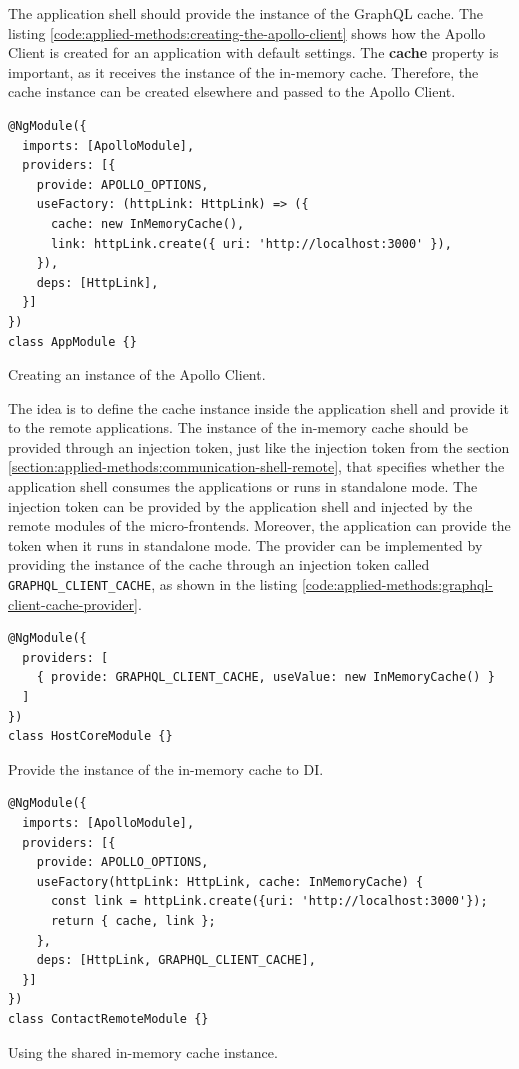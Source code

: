 \noindent The application shell should provide the instance of the GraphQL cache. The listing \ref{code:applied-methods:creating-the-apollo-client} shows how the Apollo Client is created for an application with default settings. The \textbf{cache} property is important, as it receives the instance of the in-memory cache. Therefore, the cache instance can be created elsewhere and passed to the Apollo Client. 
\ifshowListings
\begin{listing}[H]
\begin{verbatim}
@NgModule({
  imports: [ApolloModule],
  providers: [{
    provide: APOLLO_OPTIONS,
    useFactory: (httpLink: HttpLink) => ({
      cache: new InMemoryCache(),
      link: httpLink.create({ uri: 'http://localhost:3000' }),
    }),
    deps: [HttpLink],
  }]
})
class AppModule {}
\end{verbatim}
\caption{Creating an instance of the Apollo Client.}\label{code:applied-methods:creating-the-apollo-client}
\end{listing}
\fi

\noindent The idea is to define the cache instance inside the application shell and provide it to the remote applications. The instance of the in-memory cache should be provided through an injection token, just like the injection token from the section \ref{section:applied-methods:communication-shell-remote}, that specifies whether the application shell consumes the applications or runs in standalone mode. The injection token can be provided by the application shell and injected by the remote modules of the micro-frontends. Moreover, the application can provide the token when it runs in standalone mode. The provider can be implemented by providing the instance of the cache through an injection token called \texttt{GRAPHQL\_CLIENT\_CACHE}, as shown in the listing \ref{code:applied-methods:graphql-client-cache-provider}.

\ifshowListings
\begin{listing}[H]
\begin{verbatim}
@NgModule({
  providers: [
    { provide: GRAPHQL_CLIENT_CACHE, useValue: new InMemoryCache() }
  ]
})
class HostCoreModule {}
\end{verbatim}
\caption{Provide the instance of the in-memory cache to \ac{DI}.}\label{code:applied-methods:graphql-client-cache-provider}
\end{listing}
\fi


\ifshowListings
\begin{listing}[H]
\begin{verbatim}
@NgModule({
  imports: [ApolloModule],
  providers: [{
    provide: APOLLO_OPTIONS,
    useFactory(httpLink: HttpLink, cache: InMemoryCache) {
      const link = httpLink.create({uri: 'http://localhost:3000'});
      return { cache, link };
    },
    deps: [HttpLink, GRAPHQL_CLIENT_CACHE],
  }]
})
class ContactRemoteModule {}
\end{verbatim}
\caption{Using the shared in-memory cache instance.}\label{code:applied-methods:creating-the-apollo-client-with-a-shared-cache}
\end{listing}
\fi

